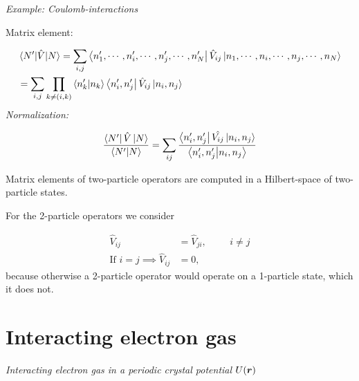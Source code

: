 \noindent \emph{Example: Coulomb-interactions}

\noindent Matrix element:

\begin{align}
	&\mel{N'}{\hat{V}}{N}
	= \sum_{i,j} \bra{n'_1, \cdots , n'_i, \cdots, n'_j, \cdots, n'_N} \hat{V}_{ij} \ket{n_1, \cdots , n_i, \cdots, n_j, \cdots, n_N}\\
	&= \sum_{i,j} \prod_{k\neq (i,k)} \braket{n'_k}{n_k} \bra{n'_i, n'_j} \hat{V}_{ij} \ket{n_i, n_j}
\end{align}
\noindent \emph{Normalization:}

\begin{equation}
	\frac{\bra{N'} \hat{V} \ket{N}}{\braket{N'}{N}} = \sum_{ij} \frac{\bra{n'_i, n'_j}\hat{V_{ij}}\ket{n_i, n_j}}{\braket{n'_i,n'_j}{n_i,n_j}}
\end{equation}

\begin{tcolorbox}
	Matrix elements of two-particle operators are computed in a Hilbert-space of two-particle states.
\end{tcolorbox}

\noindent For the 2-particle operators we consider

\begin{align}
	\hat{V}_{ij} &= \hat{V}_{ji}, \hspace{1cm} i \neq j\\
	\text{If } i=j \implies \hat{V}_{ij} &=0, \nonumber 
\end{align}
because otherwise a 2-particle operator would operate on a 1-particle state, which it does not.\\
\linebreak

\section{Interacting electron gas}
\noindent \emph{Interacting electron gas in a periodic crystal potential $U(\bm{r})$}

\begin{figure}
    \centering
{}
\end{figure}

